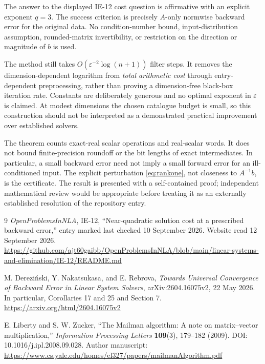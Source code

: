 \documentclass[11pt,a4paper]{article}
\theoremstyle{remark}
\newcommand{\eps}{\varepsilon}
\begin{document}
The answer to the displayed IE-12 cost question is affirmative with an
explicit exponent $q=3$. The success criterion is precisely $A$-only
normwise backward error for the original data. No condition-number bound,
input-distribution assumption, rounded-matrix invertibility, or restriction
on the direction or magnitude of $b$ is used.

The method still takes $O(\eps^{-2}\log(n+1))$ filter steps. It removes the
dimension-dependent logarithm from \emph{total arithmetic cost} through
entry-dependent preprocessing, rather than proving a dimension-free black-box
iteration rate. Constants are deliberately generous and no optimal exponent
in $\eps$ is claimed. At modest dimensions the chosen catalogue budget is
small, so this construction should not be interpreted as a demonstrated
practical improvement over established solvers.

The theorem counts exact-real scalar operations and real-scalar words.
It does not bound finite-precision roundoff or the bit lengths of exact
intermediates. In particular, a small backward error need not imply a small
forward error for an ill-conditioned input. The explicit perturbation
\eqref{eq:rankone}, not closeness to $A^{-1}b$, is the certificate.
The result is presented with a self-contained proof; independent mathematical
review would be appropriate before treating it as an externally established
resolution of the repository entry.

\clearpage
\begin{thebibliography}{9}
\emph{OpenProblemsInNLA}, IE-12, ``Near-quadratic solution cost at a prescribed
backward error,'' entry marked last checked 10 September 2026. Website read
12 September 2026.\\
\url{https://github.com/ajt60gaibb/OpenProblemsInNLA/blob/main/linear-systems-and-elimination/IE-12/README.md}

M. Derezi\'nski, Y. Nakatsukasa, and E. Rebrova,
\emph{Towards Universal Convergence of Backward Error in Linear System
Solvers}, arXiv:2604.16075v2, 22 May 2026. In particular, Corollaries 17 and 25
and Section 7.\\
\url{https://arxiv.org/html/2604.16075v2}

E. Liberty and S. W. Zucker,
``The Mailman algorithm: A note on matrix--vector multiplication,''
\emph{Information Processing Letters} \textbf{109}(3), 179--182 (2009).
DOI: 10.1016/j.ipl.2008.09.028. Author manuscript: \\
\url{https://www.cs.yale.edu/homes/el327/papers/mailmanAlgorithm.pdf}
\end{thebibliography}
\end{document}

